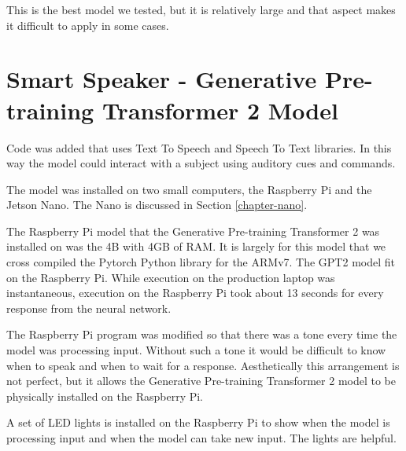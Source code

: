This is the best model we tested, but it is relatively large and that aspect makes it difficult to apply in some cases.

\section{Smart Speaker - Generative Pre-training Transformer 2 Model}

\label{install-gpt2-smart}
Code was added that uses Text To Speech and Speech To Text libraries. In this way the model could interact with a subject using auditory cues and commands.

The model was installed on two small computers, the Raspberry Pi and the Jetson Nano. The Nano is discussed in Section \ref{chapter-nano}.

The Raspberry Pi model that the Generative Pre-training Transformer 2 was installed on was the 4B with 4GB of RAM. It is largely for this model that we cross compiled the Pytorch Python library for the ARMv7. The GPT2 model fit on the Raspberry Pi. While execution on the production laptop was instantaneous, execution on the Raspberry Pi took about 13 seconds for every response from the neural network.

The Raspberry Pi program was modified so that there was a tone every time the model was processing input. Without such a tone it would be difficult to know when to speak and when to wait for a response. Aesthetically this arrangement is not perfect, but it allows the Generative Pre-training Transformer 2 model to be physically installed on the Raspberry Pi.

A set of LED lights is installed on the Raspberry Pi to show when the model is processing input and when the model can take new input. The lights are helpful.
